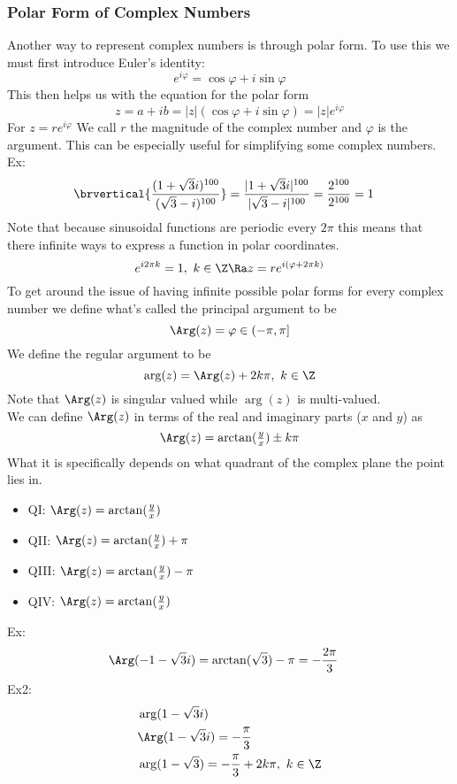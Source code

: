 \subsubsection{Polar Form of Complex Numbers}
Another way to represent complex numbers is through polar form. To use this we must first introduce Euler's identity:
$$e^{i\varphi}=\cos\varphi+i\sin\varphi$$
This then helps us with the equation for the polar form
$$z=a+ib=|z|(\cos\varphi+i\sin\varphi)=|z|e^{i\varphi}$$
For $z=re^{i\varphi}$ We call $r$ the magnitude of the complex number and $\varphi$ is the argument. This can be especially useful for simplifying some complex numbers.\\
Ex:
\begin{align*}
    &\brvertical{\frac{(1+\sqrt{3}i)^{100}}{(\sqrt{3}-i)^{100}}}=\frac{|1+\sqrt{3}i|^{100}}{|\sqrt{3}-i|^{100}}=\frac{2^{100}}{2^{100}}=1
\end{align*}
Note that because sinusoidal functions are periodic every $2\pi$ this means that there infinite ways to express a function in polar coordinates. 
\[
e^{i2\pi k}=1,\ k\in\Z\Ra z=re^{i(\varphi+2\pi k)}
\]
To get around the issue of having infinite possible polar forms for every complex number we define what's called the principal argument to be
$$\Arg(z)=\varphi\in(-\pi,\pi]$$
We define the regular argument to be
$$\arg(z)=\Arg(z)+2k\pi,\ k\in\Z$$
Note that $\Arg(z)$ is singular valued while $\arg(z)$ is multi-valued.\\
We can define $\Arg(z)$ in terms of the real and imaginary parts ($x$ and $y$) as
$$\Arg(z)=\arctan(\tfrac{y}{x})\pm k\pi$$
What it is specifically depends on what quadrant of the complex plane the point lies in.
\begin{itemize}
    \item QI: $\Arg(z)=\arctan(\tfrac{y}{x})$
    \item QII: $\Arg(z)=\arctan(\tfrac{y}{x})+\pi$
    \item QIII: $\Arg(z)=\arctan(\tfrac{y}{x})-\pi$
    \item QIV: $\Arg(z)=\arctan(\tfrac{y}{x})$
\end{itemize}
Ex:
\begin{align*}
    &\Arg(-1-\sqrt{3}i)=\arctan(\sqrt{3})-\pi=-\frac{2\pi}{3}
\end{align*}
Ex2:
\begin{align*}
    &\arg(1-\sqrt{3}i)\\
    &\Arg(1-\sqrt{3}i)=-\frac{\pi}{3}\\
    &\arg(1-\sqrt{3})=-\frac{\pi}{3}+2k\pi,\ k\in\Z
\end{align*}
